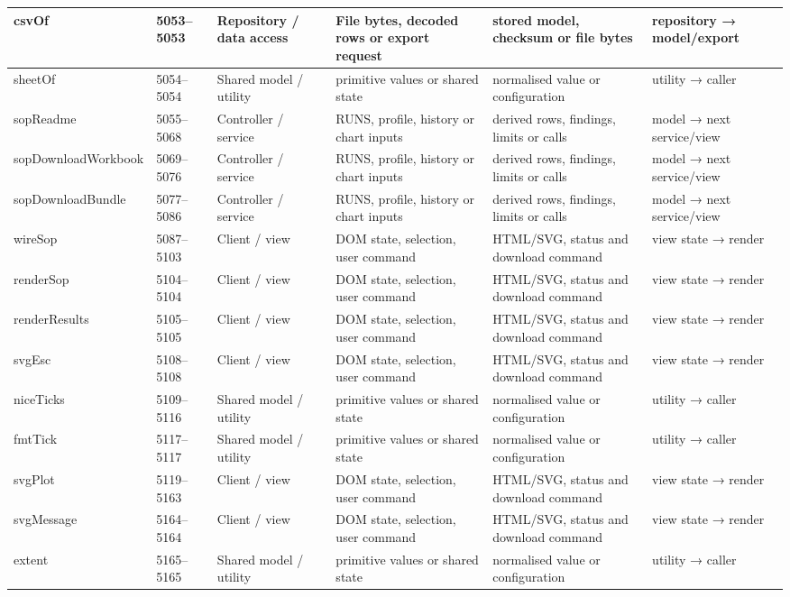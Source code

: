 \begin{landscape}
\begin{longtable}{@{}p{3.2cm}p{1.45cm}p{2.7cm}p{4.0cm}p{4.0cm}p{3.0cm}@{}}
csvOf & 5053--5053 & Repository / data access & File bytes, decoded rows or export request & stored model, checksum or file bytes & repository → model/export \\\hline
sheetOf & 5054--5054 & Shared model / utility & primitive values or shared state & normalised value or configuration & utility → caller \\\hline
sopReadme & 5055--5068 & Controller / service & RUNS, profile, history or chart inputs & derived rows, findings, limits or calls & model → next service/view \\\hline
sopDownloadWorkbook & 5069--5076 & Controller / service & RUNS, profile, history or chart inputs & derived rows, findings, limits or calls & model → next service/view \\\hline
sopDownloadBundle & 5077--5086 & Controller / service & RUNS, profile, history or chart inputs & derived rows, findings, limits or calls & model → next service/view \\\hline
wireSop & 5087--5103 & Client / view & DOM state, selection, user command & HTML/SVG, status and download command & view state → render \\\hline
renderSop & 5104--5104 & Client / view & DOM state, selection, user command & HTML/SVG, status and download command & view state → render \\\hline
renderResults & 5105--5105 & Client / view & DOM state, selection, user command & HTML/SVG, status and download command & view state → render \\\hline
svgEsc & 5108--5108 & Client / view & DOM state, selection, user command & HTML/SVG, status and download command & view state → render \\\hline
niceTicks & 5109--5116 & Shared model / utility & primitive values or shared state & normalised value or configuration & utility → caller \\\hline
fmtTick & 5117--5117 & Shared model / utility & primitive values or shared state & normalised value or configuration & utility → caller \\\hline
svgPlot & 5119--5163 & Client / view & DOM state, selection, user command & HTML/SVG, status and download command & view state → render \\\hline
svgMessage & 5164--5164 & Client / view & DOM state, selection, user command & HTML/SVG, status and download command & view state → render \\\hline
extent & 5165--5165 & Shared model / utility & primitive values or shared state & normalised value or configuration & utility → caller \\\hline

\end{longtable}
\end{landscape}

